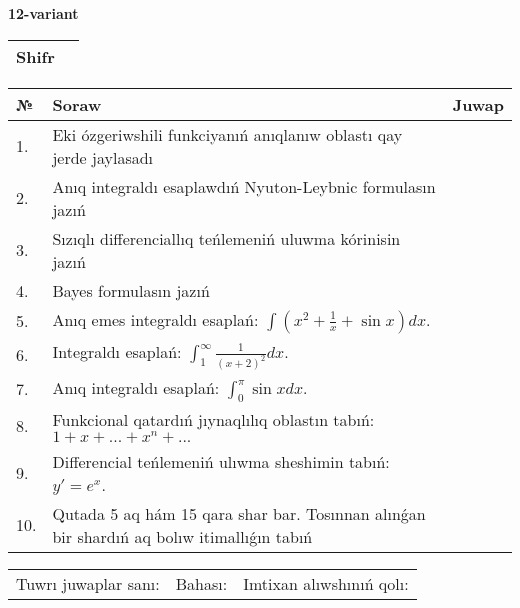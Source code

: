 \documentclass{article}
\begin{document}
  \egroup
  
  \newpage
  
  
  \textbf{12-variant}\\
  
  \bgroup
  \def\arraystretch{1.6} %
  
  \begin{tabular}{|m{5.7cm}|m{9.5cm}|}
  \hline
  Shifr & \\
  \hline
  \end{tabular}
  
  \vspace{1cm}
  
  \begin{tabular}{|m{0.7cm}|m{10cm}|m{4cm}|}
  \hline
  № & Soraw & Juwap \\
  \hline
  1. & Eki ózgeriwshili funkciyanıń anıqlanıw oblastı qay jerde jaylasadı &  \\
  \hline
  2. & Anıq integraldı esaplawdıń Nyuton-Leybnic formulasın jazıń &  \\
  \hline
  3. & Sızıqlı differenciallıq teńlemeniń uluwma kórinisin jazıń &  \\
  \hline
  4. & Bayes formulasın jazıń &  \\
  \hline
  5. & Anıq emes integraldı esaplań: \(\int{\left( x^2  + \frac{1}{x} + \sin x \right)dx}\). &  \\
  \hline
  6. & Integraldı esaplań: \(\int_{1}^{\infty}{\frac{1}{(x + 2)^2 }dx}\). &  \\
  \hline
  7. & Anıq integraldı esaplań: \(\int_{0}^{\pi}{\sin xdx}\). &  \\
  \hline
  8. & Funkcional qatardıń jıynaqlılıq oblastın tabıń:\(1 + x + ... + x^{n} + ...\) &  \\
  \hline
  9. & Differencial teńlemeniń ulıwma sheshimin tabıń: \(y' = e^{x}\). &  \\
  \hline
  10. & Qutada 5 aq hám 15 qara shar bar. Tosınnan alınǵan bir shardıń aq bolıw itimallıǵın tabıń &  \\
  \hline
  \end{tabular}
  
  \vspace{1cm}
  
  \begin{tabular}{lll}
  Tuwrı juwaplar sanı: \underline{\hspace{1.5cm}} & 
  Bahası: \underline{\hspace{1.5cm}} & 
  Imtixan alıwshınıń qolı: \underline{\hspace{2cm}} \\
  \end{tabular}
  
\end{document}

